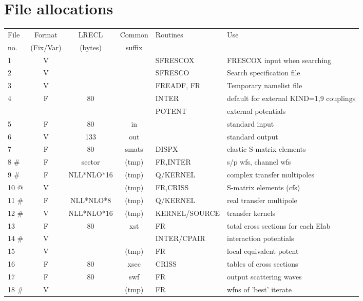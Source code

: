 \documentclass[11pt]{article}
\begin{document}
\section{File allocations}
\label{files}
{\small 
\begin{tabular}{|l | c c c | l | l|}
\hline
File & Format & LRECL  & Common & Routines & Use \\
 no. & (Fix/Var) & (bytes) &suffix &  &  \\
\hline
1    &  V &             &     &     SFRESCOX& FRESCOX input when searching\\
2    &  V &             &    &     SFRESCO& Search specification file\\
3    &  V &             &    &     FREADF, FR& Temporary namelist file\\
4    &  F &     80      &    &     INTER & default for external KIND=1,9 couplings\\
     &    &             &    &     POTENT &external potentials\\
5    &  F &     80      & in  &         &   standard input\\
6    &  V &    133      & out  &          &  standard output\\
7    &  F &     80      & smats &     DISPX & elastic S-matrix elements\\
8  \# &  F &   sector    &   (tmp) &     FR,INTER & s/p wfs, channel wfs\\
9  \# &  F &  NLL*NLO*16    &  (tmp)& Q/KERNEL &  complex transfer multipoles\\
10  @ &  V &             &  (tmp)  &     FR,CRISS & S-matrix elements (cfs)\\
11  \# &  F & NLL*NLO*8 &  (tmp) & Q/KERNEL &  real transfer multipole\\
12  \# &  V &NLL*NLO*16 & (tmp)  &   KERNEL/SOURCE&transfer kernels\\
13    &  F &    80      & xst  &      FR   &    total cross sections for each Elab\\
14  \#  & V &             &    &   INTER/CPAIR &interaction potentials\\
15    &  V &           & (tmp)  &       FR   &   local equivalent potent\\
16    &  F &     80      & xsec  &       CRISS &  tables of cross sections\\
17    &  F &     80      & swf  &       FR  &    output scattering waves\\
18  \# &  V &             & (tmp)  &       FR  &    wfns of 'best' iterate\\

\end{tabular}}
\end{document}

